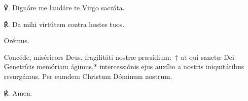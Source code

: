 \noindent ℣. Dignáre me laudáre te Virgo sacráta.

\noindent ℟. Da mihi virtútem contra hostes tuos.

Orémus.

\noindent Concéde, miséricors Deus, fragilitáti nostræ præsídium:~† ut qui sanctæ Dei Genetrícis memóriam ágimus,* intercessiónis ejus auxílio a nostris iniquitátibus resurgámus. Per eumdem Christum Dóminum nostrum.

\noindent ℟. Amen.
